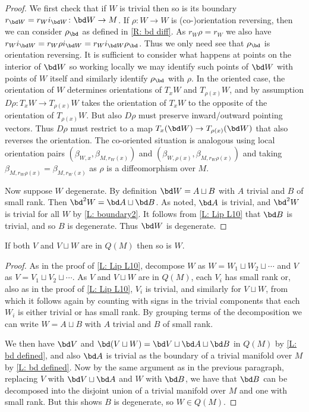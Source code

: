 \begin{proof}
	We first check that if $W$ is trivial then so is its boundary $r_{\bd W} = r_Wi_{\bd W} \colon \bd W \to M$.
	If $\rho \colon W \to W$ is (co-)orientation reversing, then we can consider $\rho_\bd$ as defined in \cref{R: bd diff}.
	As $r_W\rho = r_W$ we also have $r_Wi_{\bd W} = r_W\rho i_{\bd W} = r_W i_{\bd W} \rho_\bd$.
	Thus we only need see that $\rho_\bd$ is orientation reversing.
	It is sufficient to consider what happens at points on the interior of $\bd W$ so working locally we may identify such points of $\bd W$ with points of $W$ itself and similarly identify $\rho_\bd$ with $\rho$.
	In the oriented case, the orientation of $W$ determines orientations of $T_xW$ and $T_{\rho(x)}W$, and by assumption $D\rho: T_xW \to T_{\rho(x)}W$ takes the orientation of $T_xW$ to the opposite of the orientation of $T_{\rho(x)}W$.
	But also $D\rho$ must preserve inward/outward pointing vectors.
	Thus $D\rho$ must restrict to a map $T_x (\bd W) \to T_{\rho(x)}(\bd W)$ that also reverses the orientation.
	The co-oriented situation is analogous using local orientation pairs $\left(\beta_{W,x}, \beta_{M,r_W(x)}\right)$ and $\left(\beta_{W,\rho(x)}, \beta_{M,r_W\rho(x)}\right)$ and taking $\beta_{M,r_W\rho(x)} = \beta_{M,r_W(x)}$ as $\rho$ is a diffeomorphism over $M$.

	Now suppose $W$ degenerate.
	By definition $\bd W = A \sqcup B$ with $A$ trivial and $B$ of small rank.
	Then $\bd^2 W = \bd A \sqcup \bd B$.
	As noted, $\bd A$ is trivial, and $\bd^2 W$ is trivial for all $W$ by \cref{L: boundary2}.
	It follows from \cref{L: Lip L10} that $\bd B$ is trivial, and so $B$ is degenerate.
	Thus $\bd W$ is degenerate.
\end{proof}

\begin{lemma}\label{L: Lipy12}
	If both $V$ and $V \sqcup W$ are in $Q(M)$ then so is $W$.
\end{lemma}

\begin{proof}
	As in the proof of \cref{L: Lip L10}, decompose $W$ as $W = W_1 \sqcup W_2 \sqcup \cdots$ and $V$ as $V = V_1 \sqcup V_2 \sqcup \cdots$.
	As $V$ and $V \sqcup W$ are in $Q(M)$, each $V_i$ has small rank or, also as in the proof of \cref{L: Lip L10}, $V_i$ is trivial, and similarly for $V \sqcup W$, from which it follows again by counting with signs in the trivial components that each $W_i$ is either trivial or has small rank.
	By grouping terms of the decomposition we can write $W = A \sqcup B$ with $A$ trivial and $B$ of small rank.

	We then have $\bd V$ and $\bd (V \sqcup W) = \bd V \sqcup \bd A \sqcup \bd B$ in $Q(M)$ by \cref{L: bd defined}, and also $\bd A$ is trivial as the boundary of a trivial manifold over $M$ by \cref{L: bd defined}.
	Now by the same argument as in the previous paragraph, replacing $V$ with $\bd V \sqcup \bd A$ and $W$ with $\bd B$, we have that $\bd B$ can be decomposed into the disjoint union of a trivial manifold over $M$ and one with small rank.
	But this shows $B$ is degenerate, so $W \in Q(M)$.
\end{proof}

